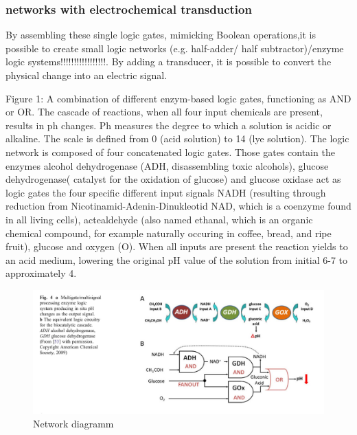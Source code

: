\documentclass[runningheads]{llncs}
\begin{document}
	
	\subsubsection{networks with electrochemical transduction}
		By assembling these single logic gates, mimicking Boolean operations,it is possible to create small logic networks (e.g. half-adder/ half subtractor)/enzyme logic systems!!!!!!!!!!!!!!!!!. By adding a transducer, it is possible to convert the physical change into an electric signal.
	
		Figure 1: A combination of different enzym-based logic gates, functioning as AND or OR. The cascade of reactions, when all four input chemicals are present, results in ph changes. Ph measures the degree to which a solution is acidic or alkaline. The scale is defined from 0 (acid solution) to 14 (lye solution).
		The logic network is composed of four concatenated logic gates. Those gates contain the enzymes alcohol dehydrogenase (ADH, disassembling toxic alcohols), glucose dehydrogenase( catalyst for the oxidation of glucose) and glucose oxidase act as logic gates the four specific different input signals NADH (resulting through reduction from Nicotinamid-Adenin-Dinukleotid NAD, which is a coenzyme found in all living cells),  actealdehyde (also named ethanal, which is an organic chemical compound, for example naturally occuring in coffee, bread, and ripe fruit), glucose and oxygen (O).
	 	When all inputs are present the reaction yields to an acid medium, lowering the original pH value of the solution from initial 6-7 to approximately 4.
		\begin{figure}[H] \centering \includegraphics[scale= 0.3]{pics/biocomputing_sensor.png} \caption{Network diagramm} \label{img:grafik-test} \end{figure}
	
	
\end{document}
